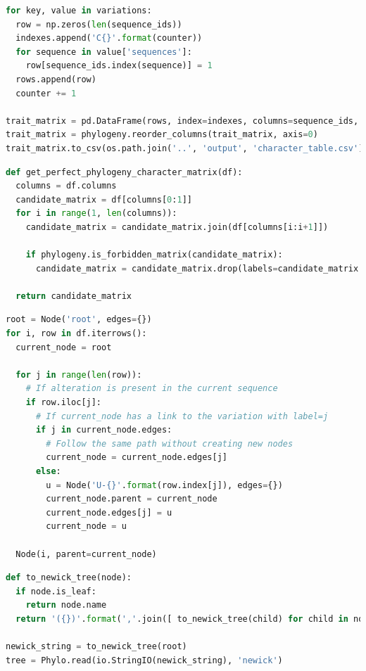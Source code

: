 \documentclass[11pt,italian]{article}
\begin{document}
\begin{lstlisting}[caption=Generazione della matrice binaria di caratteri,label=code:creation table.csv,language=Python]
for key, value in variations:
  row = np.zeros(len(sequence_ids))
  indexes.append('C{}'.format(counter))
  for sequence in value['sequences']:
    row[sequence_ids.index(sequence)] = 1
  rows.append(row)
  counter += 1

trait_matrix = pd.DataFrame(rows, index=indexes, columns=sequence_ids, dtype=np.uint8).transpose()
trait_matrix = phylogeny.reorder_columns(trait_matrix, axis=0)
trait_matrix.to_csv(os.path.join('..', 'output', 'character_table.csv'))
\end{lstlisting}

\begin{lstlisting}[caption=Funzione di generazione della matrice binaria per filogenesi perfetta,label=code:get_perfect_phylogeny_function,language=Python]
def get_perfect_phylogeny_character_matrix(df):
  columns = df.columns
  candidate_matrix = df[columns[0:1]]
  for i in range(1, len(columns)):
    candidate_matrix = candidate_matrix.join(df[columns[i:i+1]])

    if phylogeny.is_forbidden_matrix(candidate_matrix):
      candidate_matrix = candidate_matrix.drop(labels=candidate_matrix.columns[-1], axis=1)

  return candidate_matrix
\end{lstlisting}

\begin{lstlisting}[caption=Funzione di creazione dell'albero,label=code:tree_creation_function,language=Python]
root = Node('root', edges={})
for i, row in df.iterrows():
  current_node = root

  for j in range(len(row)):
    # If alteration is present in the current sequence
    if row.iloc[j]:
      # If current_node has a link to the variation with label=j
      if j in current_node.edges:
        # Follow the same path without creating new nodes
        current_node = current_node.edges[j]
      else:
        u = Node('U-{}'.format(row.index[j]), edges={})
        current_node.parent = current_node
        current_node.edges[j] = u
        current_node = u

  Node(i, parent=current_node)
\end{lstlisting}

\begin{lstlisting}[caption=Funzione di conversione in Newick Tree,label=code:newick_tree_function,language=Python]
def to_newick_tree(node):
  if node.is_leaf:
    return node.name
  return '({})'.format(','.join([ to_newick_tree(child) for child in node.children ]))

newick_string = to_newick_tree(root)
tree = Phylo.read(io.StringIO(newick_string), 'newick')
\end{lstlisting}
\end{document}
